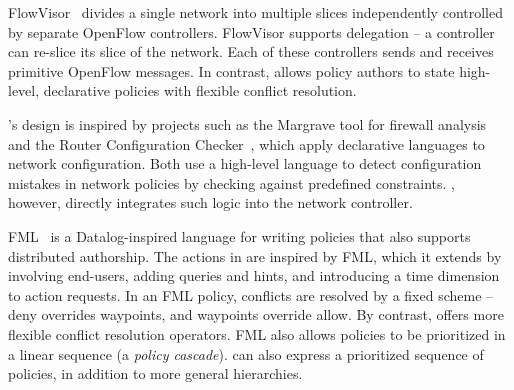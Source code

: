 FlowVisor~\cite{Sherwood:2010} divides a single network into multiple slices
independently controlled by separate OpenFlow controllers. FlowVisor
supports delegation -- a controller can re-slice its slice of the
network. Each of these controllers sends and receives primitive
OpenFlow messages. In contrast, \sys allows policy authors to
state high-level, declarative policies with flexible conflict resolution.





\sys's design is inspired by projects such as the Margrave tool for firewall 
analysis~\cite{n++:lisa-margrave-firewalls} and the Router Configuration
Checker~\cite{Feamster:2005}, which apply declarative languages to
network configuration. Both use a high-level language to detect configuration 
mistakes in network policies by checking against predefined constraints. 
\sys, however, directly integrates such logic into the network
controller.

FML~\cite{Hinrichs:2009} is a Datalog-inspired language for writing
policies that also supports distributed authorship.  
The actions in \sys are inspired by
FML, which it
extends by involving end-users, adding queries and hints, and
introducing a time dimension to action requests.
In an FML policy,
conflicts are resolved by a fixed scheme -- deny overrides waypoints,
and waypoints override allow. By contrast, \sys offers more
flexible conflict resolution operators.
%
FML also allows policies to be prioritized in a linear sequence (a
\emph{policy cascade}). \sys can also express a prioritized sequence of
policies, in addition to more general hierarchies.  


